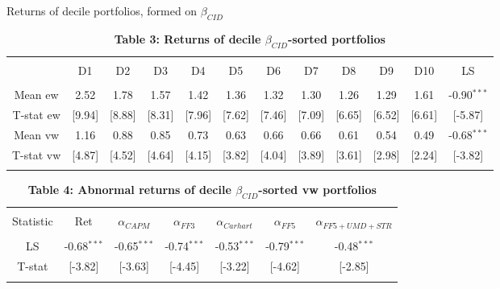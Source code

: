 \documentclass{beamer}
\begin{document}
\begin{frame}{Returns of decile portfolios, formed on $\beta_{CID}$}
\begin{table}[!htbp] \centering 
  \caption*{\textbf{Table 3: Returns of decile $\beta_{CID}$-sorted portfolios}}
  \label{} 
\begin{tabular}{@{\extracolsep{-6pt}} cccccccccccc} 
\\[-1.8ex]\hline 
\hline \\[-1.8ex] 
 & D1 & D2 & D3 & D4 & D5 & D6 & D7 & D8 & D9 & D10 & LS \\ 
\hline \\[-1.8ex] 
Mean ew & 2.52 & 1.78 & 1.57 & 1.42 & 1.36 & 1.32 & 1.30 & 1.26 & 1.29 & 1.61 & -0.90$^{***}$ \\ 
T-stat ew & [9.94] & [8.88] & [8.31] & [7.96] & [7.62] & [7.46] & [7.09] & [6.65] & [6.52] & [6.61] & [-5.87] \\ 
Mean vw & 1.16 & 0.88 & 0.85 & 0.73 & 0.63 & 0.66 & 0.66 & 0.61 & 0.54 & 0.49 & -0.68$^{***}$ \\ 
T-stat vw & [4.87] & [4.52] & [4.64] & [4.15] & [3.82] & [4.04] & [3.89] & [3.61] & [2.98] & [2.24] & [-3.82] \\ 
\hline \\[-1.8ex] 
\end{tabular} 
\end{table}

\begin{table}[!htbp] \centering 
  \caption*{\textbf{Table 4: Abnormal returns of decile $\beta_{CID}$-sorted vw portfolios}} 
  \label{} 
\begin{tabular}{@{\extracolsep{0pt}} ccccccc} 
\\[-1.8ex]\hline 
\hline \\[-1.8ex] 
Statistic & Ret & $\alpha_{CAPM}$ & $\alpha_{FF3}$ & $\alpha_{Carhart}$ & $\alpha_{FF5}$ & $\alpha_{FF5+UMD+STR}$ \\ 
\hline \\[-1.8ex] 
LS & -0.68$^{***}$ & -0.65$^{***}$ & -0.74$^{***}$ & -0.53$^{***}$ & -0.79$^{***}$ & -0.48$^{***}$ \\ 
T-stat & [-3.82] & [-3.63] & [-4.45] & [-3.22] & [-4.62] & [-2.85] \\ 
\hline \\[-1.8ex] 
\end{tabular} 
\end{table}
\end{frame}
\end{document}
